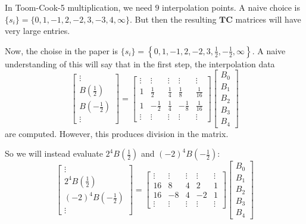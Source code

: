 \documentclass[
11pt,notheorems,hyperref={pdfauthor=whatever}
]{beamer}
\begin{document}
\begin{frame}
    In Toom-Cook-5 multiplication, we need $9$ interpolation points.
    A naive choice is $\{s_{i}\} = \{0, 1, -1, 2, -2, 3, -3, 4, \infty \}$.
    But then the resulting $\mathbf{TC}$ matrices will have very large entries.

    Now, the choise in the paper is $\{s_{i}\} = \left\{0,1,-1,2,-2,3,\frac{1}{2},-\frac{1}{2},\infty\right\}$.
    A naive understanding of this will say that in the first step, the interpolation data
    $$
\left[\begin{array}{c}
\vdots \\
B\left(\frac{1}{2}\right) \\
B\left(-\frac{1}{2}\right) \\
\vdots
\end{array}\right]=\left[\begin{array}{ccccc} 
\vdots &\vdots &\vdots &\vdots &\vdots \\
1 & \frac{1}{2} & \frac{1}{4} & \frac{1}{8} & \frac{1}{16} \\
1 & -\frac{1}{2} & \frac{1}{4} & -\frac{1}{8} & \frac{1}{16}\\
\vdots & \vdots &\vdots &\vdots &\vdots 
\end{array}\right]\left[\begin{array}{c}
B_0 \\
B_1 \\
B_2 \\
B_3 \\
B_4
\end{array}\right]
$$
    are computed. 
    However, this produces division in the matrix. 
    

\end{frame}

\begin{frame}
    So we will instead evaluate $2^4 B(\frac{1}{2})$ and $(-2)^{4} B(-\frac{1}{2})$:
    $$
    \left[\begin{array}{c}
    \vdots \\
    2^4B\left(\frac{1}{2}\right) \\
    (-2)^4B\left(-\frac{1}{2}\right) \\
    \vdots
    \end{array}\right]=\left[\begin{array}{ccccc} 
    \vdots &\vdots &\vdots &\vdots &\vdots \\
    16 & 8 & 4 & 2 & 1 \\
    16 & -8 & 4 & -2 & 1 \\
    \vdots & \vdots &\vdots &\vdots &\vdots 
    \end{array}\right]\left[\begin{array}{c}
    B_0 \\
    B_1 \\
    B_2 \\
    B_3 \\
    B_4
    \end{array}\right]
    $$
\end{frame}
\end{document}
